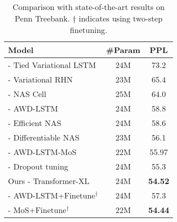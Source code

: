 \begin{table}[t]
    \small
    \centering
    \begin{adjustwidth}{-5pt}{}
    \begin{tabular}{l|cc}
        \toprule
        \bf Model & \bf \#Param & \bf PPL \\
        \midrule
        \citet{inan2016tying} - Tied Variational LSTM & 24M & 73.2 \\
        \citet{zilly2016recurrent} - Variational RHN & 23M & 65.4 \\
        \citet{zoph2016neural} - NAS Cell & 25M & 64.0 \\
        \citet{merity2017regularizing} - AWD-LSTM & 24M & 58.8 \\
        \citet{pham2018efficient} - Efficient NAS & 24M & 58.6 \\
        \citet{liu2018darts} - Differentiable NAS & 23M & 56.1 \\
        \citet{yang2017breaking} - AWD-LSTM-MoS & 22M & 55.97 \\
        \citet{melis2018pushing} - Dropout tuning & 24M & 55.3 \\
        \midrule
        Ours - Transformer-XL & 24M & \textbf{54.52} \\
        \midrule
        \citet{merity2017regularizing} - AWD-LSTM+Finetune$^\dagger$ & 24M & 57.3 \\
        \citet{yang2017breaking} - MoS+Finetune$^\dagger$ & 22M & \textbf{54.44} \\
        \bottomrule
    \end{tabular}
    \caption{\small
        Comparison with state-of-the-art results on Penn Treebank. $\dagger$ indicates using two-step finetuning.
    }
    \label{table:ptb}
	\end{adjustwidth}
\end{table}
\egroup

